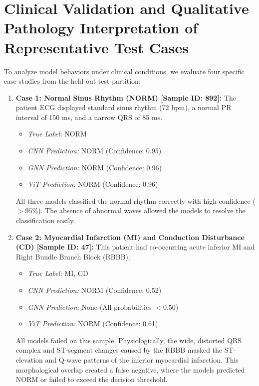 \documentclass[12pt,a4paper]{report}
\begin{document}
\section{Clinical Validation and Qualitative Pathology Interpretation of Representative Test Cases}
To analyze model behaviors under clinical conditions, we evaluate four specific case studies from the held-out test partition:
\begin{enumerate}
    \item \textbf{Case 1: Normal Sinus Rhythm (NORM) [Sample ID: 892]:}
    The patient ECG displayed standard sinus rhythm (72 bpm), a normal PR interval of 150 ms, and a narrow QRS of 85 ms.
    \begin{itemize}
        \item \emph{True Label:} NORM
        \item \emph{CNN Prediction:} NORM (Confidence: 0.95)
        \item \emph{GNN Prediction:} NORM (Confidence: 0.96)
        \item \emph{ViT Prediction:} NORM (Confidence: 0.96)
    \end{itemize}
    All three models classified the normal rhythm correctly with high confidence ($>95\%$). The absence of abnormal waves allowed the models to resolve the classification easily.
    
    \item \textbf{Case 2: Myocardial Infarction (MI) and Conduction Disturbance (CD) [Sample ID: 47]:}
    This patient had co-occurring acute inferior MI and Right Bundle Branch Block (RBBB).
    \begin{itemize}
        \item \emph{True Label:} MI, CD
        \item \emph{CNN Prediction:} NORM (Confidence: 0.52)
        \item \emph{GNN Prediction:} None (All probabilities $< 0.50$)
        \item \emph{ViT Prediction:} NORM (Confidence: 0.61)
    \end{itemize}
    All models failed on this sample. Physiologically, the wide, distorted QRS complex and ST-segment changes caused by the RBBB masked the ST-elevation and Q-wave patterns of the inferior myocardial infarction. This morphological overlap created a false negative, where the models predicted NORM or failed to exceed the decision threshold.
    

\end{enumerate}
\end{document}
